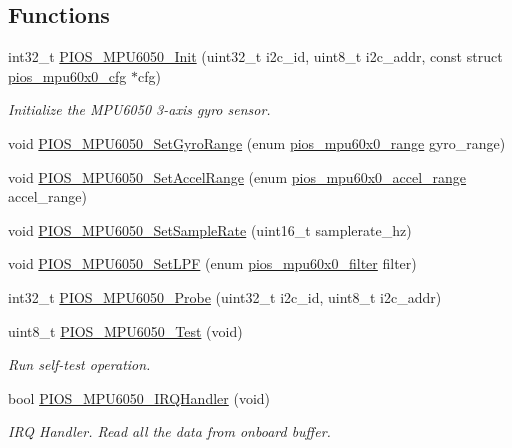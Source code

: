 \subsection*{\-Functions}
\begin{DoxyCompactItemize}
\item 
int32\-\_\-t \hyperlink{group___p_i_o_s___m_p_u6050_gac57f42dba9e222c61a1584c67d6874be}{\-P\-I\-O\-S\-\_\-\-M\-P\-U6050\-\_\-\-Init} (uint32\-\_\-t i2c\-\_\-id, uint8\-\_\-t i2c\-\_\-addr, const struct \hyperlink{structpios__mpu60x0__cfg}{pios\-\_\-mpu60x0\-\_\-cfg} $\ast$cfg)
\begin{DoxyCompactList}\small\item\em \-Initialize the \-M\-P\-U6050 3-\/axis gyro sensor. \end{DoxyCompactList}\item 
void \hyperlink{group___p_i_o_s___m_p_u6050_ga895ee6650c95651c9b6bb12d94181c79}{\-P\-I\-O\-S\-\_\-\-M\-P\-U6050\-\_\-\-Set\-Gyro\-Range} (enum \hyperlink{group___p_i_o_s___m_p_u60_x0_ga56700b0154a14cf67c9f8f44a86ad9c0}{pios\-\_\-mpu60x0\-\_\-range} gyro\-\_\-range)
\item 
void \hyperlink{group___p_i_o_s___m_p_u6050_gada6357c3fb3a3911929c525730194b83}{\-P\-I\-O\-S\-\_\-\-M\-P\-U6050\-\_\-\-Set\-Accel\-Range} (enum \hyperlink{group___p_i_o_s___m_p_u60_x0_ga8f297bddae3eb43bbf7b54abc6494992}{pios\-\_\-mpu60x0\-\_\-accel\-\_\-range} accel\-\_\-range)
\item 
void \hyperlink{group___p_i_o_s___m_p_u6050_ga812644156bea8701f60a0da46b4ad5e7}{\-P\-I\-O\-S\-\_\-\-M\-P\-U6050\-\_\-\-Set\-Sample\-Rate} (uint16\-\_\-t samplerate\-\_\-hz)
\item 
void \hyperlink{group___p_i_o_s___m_p_u6050_ga5965e8d1b3d1ecdef09ccf03a3dfa3c0}{\-P\-I\-O\-S\-\_\-\-M\-P\-U6050\-\_\-\-Set\-L\-P\-F} (enum \hyperlink{group___p_i_o_s___m_p_u60_x0_gacce1988bc994f5ade6ac748c2bf0b924}{pios\-\_\-mpu60x0\-\_\-filter} filter)
\item 
int32\-\_\-t \hyperlink{group___p_i_o_s___m_p_u6050_gad5a659852b9fe80e1870363eb75b22c1}{\-P\-I\-O\-S\-\_\-\-M\-P\-U6050\-\_\-\-Probe} (uint32\-\_\-t i2c\-\_\-id, uint8\-\_\-t i2c\-\_\-addr)
\item 
uint8\-\_\-t \hyperlink{group___p_i_o_s___m_p_u6050_ga6ccccbd6fe0ebfa82dcc4a5481a336dc}{\-P\-I\-O\-S\-\_\-\-M\-P\-U6050\-\_\-\-Test} (void)
\begin{DoxyCompactList}\small\item\em \-Run self-\/test operation. \end{DoxyCompactList}\item 
bool \hyperlink{group___p_i_o_s___m_p_u6050_ga57a952ab33508817d11a1ea755d17325}{\-P\-I\-O\-S\-\_\-\-M\-P\-U6050\-\_\-\-I\-R\-Q\-Handler} (void)
\begin{DoxyCompactList}\small\item\em \-I\-R\-Q \-Handler. \-Read all the data from onboard buffer. \end{DoxyCompactList}\end{DoxyCompactItemize}


